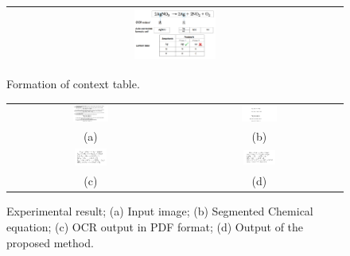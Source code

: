 \documentclass[conference]{IEEEtran}
\begin{document}
\begin{figure}[h]
\center\ 
\begin{tabular}{|c|} 
\hline
\includegraphics[width=0.25\textwidth]{equationContext.png}\\
\hline
\end{tabular} 
\caption{Formation of context table. }
\label{context} 
\end{figure}
\begin{figure}[]
\center\footnotesize
\begin{tabular}{ |c|c|}
\hline
 \includegraphics[width=0.22\textwidth]{sampleDocument.png} &
 \includegraphics[width=0.22\textwidth]{DCE.png} \\
(a)  & (b) \\ 
\hline
 \includegraphics[width=0.2\textwidth]{directOCR.jpg} &
\includegraphics[width=0.2\textwidth]{correctedFinalEq.jpg}\\
 
 (c)  & (d)  \\
 \hline
\end{tabular}
\caption{Experimental result; (a) Input image; (b) Segmented Chemical equation;
(c) OCR output in PDF format; (d) Output of the proposed method.}
\label{eg} 
\end{figure}
\end{document}
